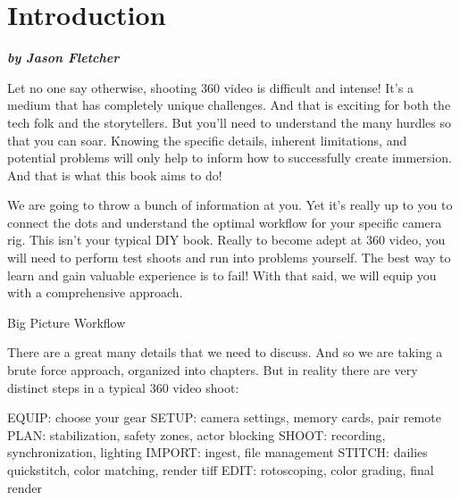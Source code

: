 
\SkipTocEntry\chapter*{Introduction}
\addtocounter{section}{2}
\begin{fullwidth}

{\itshape\bfseries by Jason Fletcher

}

Let no one say otherwise, shooting 360 video is difficult and intense! It’s a medium that has completely unique challenges. And that is exciting for both the tech folk and the storytellers. But you’ll need to understand the many hurdles so that you can soar. Knowing the specific details, inherent limitations, and potential problems will only help to inform how to successfully create immersion. And that is what this book aims to do!

We are going to throw a bunch of information at you. Yet it's really up to you to connect the dots and understand the optimal workflow for your specific camera rig. This isn’t your typical DIY book. Really to become adept at 360 video, you will need to perform test shoots and run into problems yourself. The best way to learn and gain valuable experience is to fail! With that said, we will equip you with a comprehensive approach.

{\large Big Picture Workflow\par}

There are a great many details that we need to discuss. And so we are taking a brute force approach, organized into chapters. But in reality there are very distinct steps in a typical 360 video shoot:

EQUIP: choose your gear
SETUP: camera settings, memory cards, pair remote
PLAN: stabilization, safety zones, actor blocking
SHOOT: recording, synchronization, lighting
IMPORT: ingest, file management 
STITCH: dailies quickstitch, color matching, render tiff
EDIT: rotoscoping, color grading, final render

\clearpage
\end{fullwidth}
